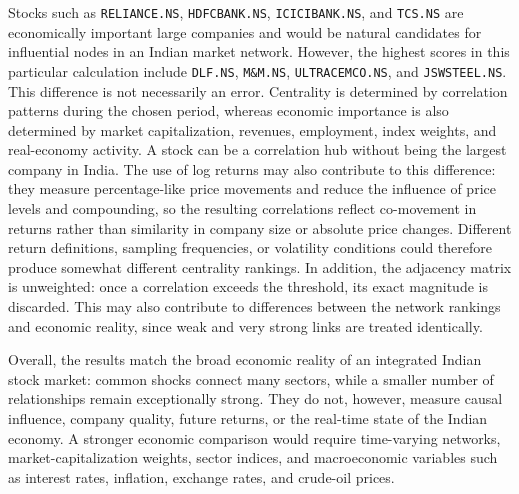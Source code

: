 \documentclass[12pt]{article}
\numberwithin{equation}{section}
\begin{document}
Stocks such as \texttt{RELIANCE.NS}, \texttt{HDFCBANK.NS},
\texttt{ICICIBANK.NS}, and \texttt{TCS.NS} are economically important large
companies and would be natural candidates for influential nodes in an Indian
market network. However, the highest scores in this particular calculation
include \texttt{DLF.NS}, \texttt{M\&M.NS}, \texttt{ULTRACEMCO.NS}, and
\texttt{JSWSTEEL.NS}. This difference is not necessarily an error. Centrality
is determined by correlation patterns during the chosen period, whereas
economic importance is also determined by market capitalization, revenues,
employment, index weights, and real-economy activity. A stock can be a
correlation hub without being the largest company in India. The use of log
returns may also contribute to this difference: they measure percentage-like
price movements and reduce the influence of price levels and compounding,
so the resulting correlations reflect co-movement in returns rather than
similarity in company size or absolute price changes. Different return
definitions, sampling frequencies, or volatility conditions could therefore
produce somewhat different centrality rankings. In addition, the adjacency
matrix is unweighted: once a correlation exceeds the threshold, its exact
magnitude is discarded. This may also contribute to differences between the
network rankings and economic reality, since weak and very strong links are
treated identically.


Overall, the results match the broad economic reality of an integrated Indian
stock market: common shocks connect many sectors, while a smaller number of
relationships remain exceptionally strong. They do not, however, measure
causal influence, company quality, future returns, or the real-time state of
the Indian economy. A stronger economic comparison would require time-varying
networks, market-capitalization weights, sector indices, and macroeconomic
variables such as interest rates, inflation, exchange rates, and crude-oil
prices.
\end{document}
